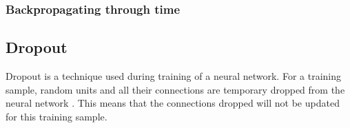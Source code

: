 \subsubsection{Backpropagating through time}

\subsection{Dropout}
\label{dead-neurons}
% 

Dropout is a technique used during training of a neural network. For a training sample, random units and all their connections are temporary dropped from the neural network \parencite{srivastava_dropout:_2014}. This means that the connections dropped will not be updated for this training sample. 


